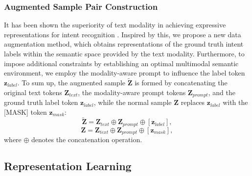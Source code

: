 \documentclass[letterpaper]{article} %
\begin{document}
\subsubsection{Augmented Sample Pair Construction}
It has been shown the superiority of text modality in achieving expressive representations for intent recognition \cite{zhang2021deep}. Inspired by this, we propose a new data augmentation method, which obtains representations of the ground truth intent labels within the semantic space provided by the text modality. Furthermore, to impose additional constraints by establishing an optimal multimodal semantic environment, we employ the modality-aware prompt to influence the label token $\textbf{z}_{label}$. To sum up, the augmented sample $\widetilde{\textbf{Z}}$ is formed by concatenating the original text tokens $\textbf{Z}_{text}$, the modality-aware prompt tokens $\textbf{Z}_{prompt}$, and the ground truth label token $\textbf{z}_{label}$, while the normal sample $\textbf{Z}$ replaces $\textbf{z}_{label}$ with the [MASK] token $\textbf{z}_{mask}$:
\begin{equation}
    \widetilde{\textbf{Z}} = \textbf{Z}_{text} \oplus \textbf{Z}_{prompt} \oplus [\textbf{z}_{label}],
\end{equation}
\begin{equation}
    \textbf{Z} = \textbf{Z}_{text} \oplus \textbf{Z}_{prompt} \oplus [\textbf{z}_{mask}],
\end{equation}
where $\oplus$ denotes the concatenation operation.

\subsection{Representation Learning}
\end{document}
